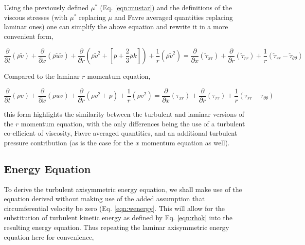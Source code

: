	Using the previously defined $\mu^*$ (Eq. \ref{eqn:mustar}) and the definitions of the viscous stresses
(with $\mu^*$ replacing $\mu$ and Favre averaged quantities replacing laminar ones) one can simplify the above equation 
and rewrite it in a more convenient form,

\begin{equation}
	\frac{\partial}{\partial t}(\overline{\rho}\tilde{v}) + \frac{\partial}{\partial x}
	(\overline{\rho}\tilde{u}\tilde{v}) + \frac{\partial}{\partial r}(\overline{\rho}\tilde{v}^2 + 
	[\overline{p} + \frac{2}{3}\overline{\rho}k])
	+ \frac{1}{r}(\overline{\rho}\tilde{v}^2) =
	\frac{\partial}{\partial x}(\tilde\tau_{xr}) + \frac{\partial}{\partial r}(\tilde\tau_{rr}) + 
	\frac{1}{r}(\tilde\tau_{rr} - \tilde\tau_{\theta \theta})
\label{eqn:rmomfinalturb}
\end{equation}

	Compared to the laminar $r$ momentum equation,

\begin{displaymath}
	\frac{\partial}{\partial t}(\rho v) + \frac{\partial}{\partial x}(\rho uv) +
	\frac{\partial}{\partial r}(\rho v^2 + p) + \frac{1}{r}(\rho v^2) = 
	\frac{\partial}{\partial x}(\tau_{xr})
	+ \frac{\partial}{\partial r}(\tau_{rr}) + \frac{1}{r}(\tau_{rr} - \tau_{\theta \theta})
\end{displaymath}

	this form highlights the similarity between the turbulent and laminar versions of the $r$ momentum 
equation, with the only differences being the use of a turbulent co-efficient of viscosity, Favre averaged quantities,
and an additional turbulent pressure contribution (as is the case for the $x$ momentum equation as well).

\subsection{Energy Equation}

	To derive the turbulent axisymmetric energy equation, we shall make use of the equation derived
without making use of the added assumption that circumferential velocity be zero (Eq. \ref{eqn:wenergy}.  
This will allow for the substitution of turbulent kinetic energy as defined by Eq. \ref{eqn:rhok} into the 
resulting energy equation.  Thus repeating the laminar axisymmetric energy equation here for convenience,

